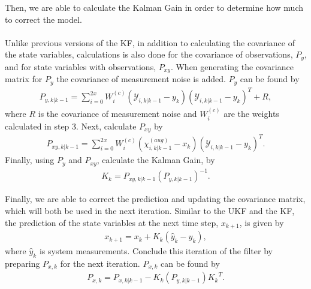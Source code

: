 \begin{enumerate}
              
       Then, we are able to calculate the Kalman Gain in order to determine how much to correct the model. \\ \\
       Unlike previous versions of the KF, in addition to calculating the covariance of the state variables, calculations is also done for the covariance of observations, $P_{y}$, and for state variables with observations, $P_{xy}$. When generating the covariance matrix for $P_{y}$ the covariance of measurement noise is added. $P_{y}$ can be found by
        \begin{align*}
       P_{y, k | k-1} = \sum^{2x}_{i = 0} W_i^{(c)} (\mathcal{Y}_{i, k | k - 1} -   y_{k} )(\mathcal{Y}_{i, k | k - 1} -  y_{k} )^T + R,
       \end{align*}
       where $R$ is the covariance of measurement noise and $W_i^{(c)} $ are the weights calculated in step 3. Next, calculate $P_{xy}$ by
        \begin{align*}
       P_{xy, k | k-1} = \sum^{2x}_{i = 0} W_i^{(c)} (\chi^{(aug)}_{i, k | k - 1} -   x_{k } )(\mathcal{Y}_{i, k | k - 1} -  y_{ k } )^T .
       \end{align*}
       Finally, using $P_{y}$ and $P_{xy}$, calculate the Kalman Gain, by
       \begin{align*}
       K_k = P_{xy, k | k-1} (P_{y, k | k-1}) ^{-1}.
       \end{align*}
        
        
        
      \noindent Finally, we are able to correct the prediction and updating the covariance matrix, which will both be used in the next iteration. Similar to the UKF and the KF, the prediction of the state variables at the next time step, $x_{k+1}$, is given by 
      \begin{align*}
        x_{k+1} = x_{k} + K_k(\hat y_k - y_{k}),
        \end{align*}
        where $\hat{y}_k$ is system measurements. Conclude this iteration of the filter by preparing $ P_{x, k} $ for the next iteration.  $P_{x, k} $ can be found by
       \begin{align*}
       P_{x, k} = P_{x, k|k-1} -K_k (P_{y, k | k-1} ) {K_k}^T.
       \end{align*}     
  
            
            
\newpage            
\centering


\end{enumerate}
